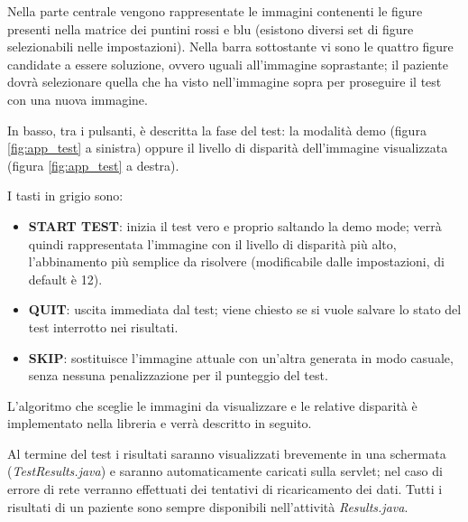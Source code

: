 \documentclass[
	corpo=12pt,
	twoside,
 	evenboxes,
	tipotesi=triennale,
    	stile=classica,
   	 greek,
]{toptesi}
\begin{document}
Nella parte centrale vengono rappresentate le immagini contenenti le figure presenti nella matrice dei puntini rossi e blu (esistono diversi set di figure selezionabili nelle impostazioni). Nella barra sottostante vi sono le quattro figure candidate a essere soluzione, ovvero uguali all'immagine soprastante; il paziente dovrà selezionare quella che ha visto nell'immagine sopra per proseguire il test con una nuova immagine.

In basso, tra i pulsanti, è descritta la fase del test: la modalità demo (figura \ref{fig:app_test} a sinistra) oppure il livello di disparità dell'immagine visualizzata (figura \ref{fig:app_test} a destra).

\vfill

\newpage

I tasti in grigio sono:
\begin{itemize}
\item \textbf{START TEST}: inizia il test vero e proprio saltando la demo mode; verrà quindi rappresentata l'immagine con il livello di disparità più alto, l'abbinamento più semplice da risolvere (modificabile dalle impostazioni, di default è 12).
\item \textbf{QUIT}: uscita immediata dal test; viene chiesto se si vuole salvare lo stato del test interrotto nei risultati.
\item \textbf{SKIP}: sostituisce l'immagine attuale con un'altra generata in modo casuale, senza nessuna penalizzazione per il punteggio del test.
\end{itemize}

L'algoritmo che sceglie le immagini da visualizzare e le relative disparità è implementato nella libreria e verrà descritto in seguito.

Al termine del test i risultati saranno visualizzati brevemente in una schermata (\textit{TestResults.java}) e saranno automaticamente caricati sulla servlet; nel caso di errore di rete verranno effettuati dei tentativi di ricaricamento dei dati. Tutti i risultati di un paziente sono sempre disponibili nell'attività \textit{Results.java}.

\vfill
\end{document}
